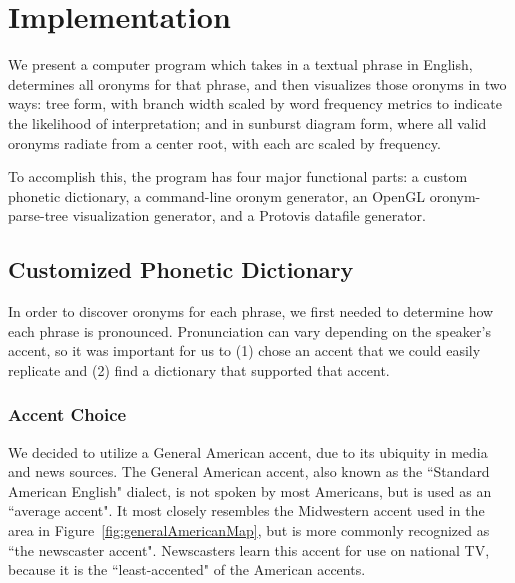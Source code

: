 \chapter{Implementation}
\label{implementation}
We present a computer program which takes in a textual phrase in English, determines all oronyms for that phrase, and then visualizes those oronyms in two ways: tree form, with branch width scaled by word frequency metrics to indicate the likelihood of interpretation; and in sunburst diagram form, where all valid oronyms radiate from a center root, with each arc scaled by frequency.

To accomplish this, the program has four major functional parts: a custom phonetic dictionary, a command-line oronym generator, an OpenGL oronym-parse-tree visualization generator, and a Protovis datafile generator. 

\section{Customized Phonetic Dictionary} 
\label{section:Implementation:customizedPhoneticDictionary}

In order to discover oronyms for each phrase, we first needed to determine how each phrase is pronounced.  Pronunciation can vary depending on the speaker's accent, so it was important for us to (1) chose an accent that we could easily replicate and (2) find a dictionary that supported that accent.  

\subsection{Accent Choice}
We decided to utilize a General American accent, due to its ubiquity in media and news sources. The General American accent, also known as the ``Standard American English" dialect, is not spoken by most Americans, but is used as an ``average accent".  It most closely resembles the Midwestern accent used in the area in Figure~\ref{fig:generalAmericanMap}, but is more commonly recognized as ``the newscaster accent". Newscasters learn this accent for use on national TV, because it is the ``least-accented" of the American accents\cite{JaneBarbe}.  

